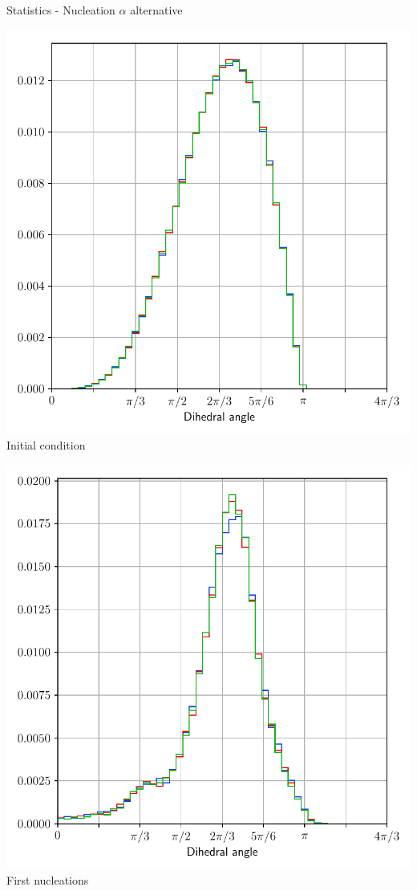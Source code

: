 \documentclass[usenames,dvipsnames]{beamer}
\begin{document}
\begin{frame}{Statistics - Nucleation $\alpha$ alternative}
\small
    \begin{minipage}{0.5\textwidth}
    \centering
    \includegraphics[scale=0.35]{figures/stored_energy/SE/dihedral/000000_nuclalternative_set.pdf}\\
    Initial condition
    \end{minipage}%
    \begin{minipage}{0.5\textwidth}
    \centering
    \includegraphics[scale=0.35]{figures/stored_energy/SE/dihedral/000070_nuclalternative_set.pdf}\\
    First nucleations
    \end{minipage}
\end{frame}
\end{document}
